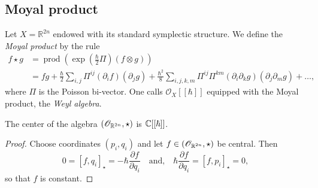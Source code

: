 \subsection{Moyal product}
\begin{definition}\label{def:moyal}
	Let $X = \mathbb{R}^{2n}$ endowed with its standard symplectic structure. We define the \textit{Moyal product} by the rule
    \begin{align}\label{eqn:weyl-moyal-free}
    	f \star g &= \operatorname{prod}\left(\exp \left(\frac{\hbar}{2}\Pi\right)(f \otimes g)\right) \\
    	&= fg + \frac{\hbar}{2}\sum_{i,j}\Pi^{ij}(\partial_{i}f)(\partial_{j}g) + \frac{\hbar^{2}}{8} \sum_{i,j,k,m} \Pi^{ij}\Pi^{km}(\partial_{i}\partial_{k}g)(\partial_{j}\partial_{m}g) + \ldots, \nonumber
    \end{align}
	where $\Pi$ is the Poisson bi-vector. One calls $\mathscr{O}_X[[\hbar]]$ equipped with the Moyal product, the \textit{Weyl algebra}.
\end{definition}
\begin{lemma}\label{lemm:center-weyl-algebra}
	The center of the algebra $(\mathscr{O}_{{\mathbb R}^{2n}}, \star)$ is ${\mathbb C}[[\hbar]]$. 
\end{lemma}
\begin{proof}
	Choose coordinates $(p_{i},q_{i})$ and let $f \in (\mathscr{O}_{{\mathbb R}^{2n}}, \star)$ be central. Then
	\[
		0 = [f,q_{i}]_{\star} = -\hbar\frac{\partial f}{\partial q_{i}}\quad \text{and,}\quad \hbar\frac{\partial f}{\partial q_{i}} = [f, p_{i}]_{\star} = 0,
	\]
	so that $f$ is constant. 
\end{proof}
